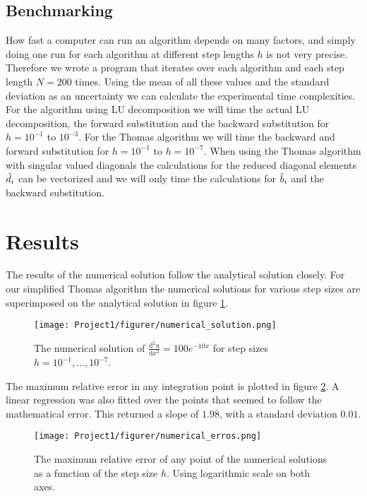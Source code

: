 \documentclass[english]{article}
\renewcommand{\d}{\mathrm{d}} %
\begin{document}
\subsection{Benchmarking}

How fast a computer can run an algorithm depends on many factors, and simply doing one run for each algorithm at different step lengths $h$ is not very precise. Therefore we wrote a program that iterates over each algorithm and each step length $N=200$ times. Using the mean of all these values and the standard deviation as an uncertainty we can calculate the experimental time complexities. For the algorithm using LU decomposition we will time the actual LU decomposition, the forward substitution and the backward substitution for $h=10^{-1}$ to $10^{-3}$. For the Thomas algorithm we will time the backward and forward substitution for $h= 10
^{-1}$ to $h = 10^{-7}$. When using the Thomas algorithm with singular valued diagonals the calculations for the reduced diagonal elements $\Tilde{d}_i$ can be vectorized and we will only time the calculations for $\Tilde{b}_i$ and the backward substitution.    

\section{Results}
The results of the numerical solution follow the analytical solution closely. For our simplified Thomas algorithm the numerical solutions for various step sizes are superimposed on the analytical solution in figure \ref{fig:num_sol}.
\begin{figure} [H]
    \centering
    \texttt{[image: Project1/figurer/numerical\_solution.png]}
    \caption{The numerical solution of $\frac{\d^2 u}{\d x^2} = 100e^{-10x}$ for step sizes $h=10^{-1}, ..., 10^{-7}$.}
    \label{fig:num_sol}
\end{figure}
The maximum relative error in any integration point is plotted in figure \ref{fig:num_err}. A linear regression was also fitted over the points that seemed to follow the mathematical error. This returned a slope of $1.98$, with a standard deviation $0.01$.
\begin{figure} [H]
    \centering
    \texttt{[image: Project1/figurer/numerical\_erros.png]}
    \caption{The maximum relative error of any point of the numerical solutions as a function of the step size $h$. Using logarithmic scale on both axes.}
    \label{fig:num_err}
\end{figure}
\end{document}
